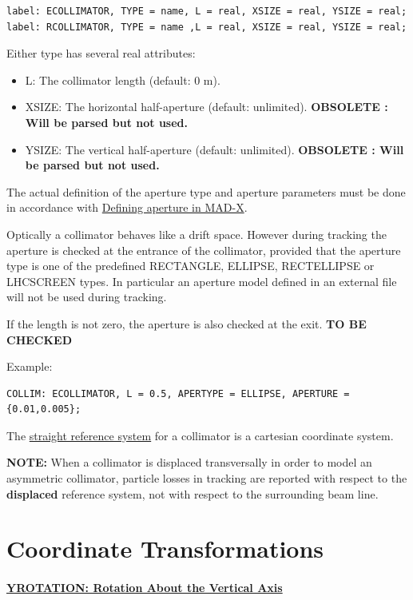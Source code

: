 \begin{verbatim}
label: ECOLLIMATOR, TYPE = name, L = real, XSIZE = real, YSIZE = real;
label: RCOLLIMATOR, TYPE = name ,L = real, XSIZE = real, YSIZE = real;
\end{verbatim}  

Either type has several real attributes: 
\begin{itemize}
   \item L: The collimator length (default: 0 m). 
   \item XSIZE: The horizontal half-aperture (default:
     unlimited). \textbf{OBSOLETE : Will be parsed but not used.} 
   \item YSIZE: The vertical half-aperture (default:
     unlimited). \textbf{OBSOLETE : Will be parsed but not used.} 
\end{itemize}  

The actual definition of the aperture type and aperture parameters must
be done in accordance with \href{aperture.html}{Defining aperture in
  MAD-X}.   

Optically a collimator behaves like a drift space.  However during
tracking the aperture is checked at the entrance of the collimator,
provided that the aperture type is one of the predefined RECTANGLE,
ELLIPSE, RECTELLIPSE or LHCSCREEN types.  In particular an aperture
model defined in an external file will not be used during tracking.  

If the length is not zero, the aperture is also checked at the
exit. \textbf{ TO BE CHECKED } 

Example: 
\begin{verbatim}
COLLIM: ECOLLIMATOR, L = 0.5, APERTYPE = ELLIPSE, APERTURE = {0.01,0.005};
\end{verbatim}

The \href{local_system.html#straight}{straight reference system} for a
collimator is a cartesian coordinate system.  

\textbf{NOTE:} When a collimator is displaced transversally in order to
model  an asymmetric collimator, particle losses in tracking are
reported with respect to the \textbf{displaced} reference system, not
with respect to the surrounding beam line.  


%
\section{Coordinate Transformations}

\paragraph{\href{yrotation}{YROTATION: Rotation About the Vertical Axis}}

